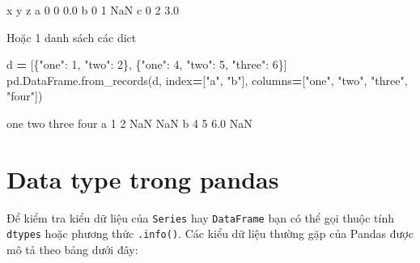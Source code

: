 \documentclass[
]{book}
\newenvironment{Shaded}{\begin{snugshade}}{\end{snugshade}}
\newcommand{\DecValTok}[1]{\textcolor[rgb]{0.00,0.00,0.81}{#1}}
\newcommand{\NormalTok}[1]{#1}
\newcommand{\OperatorTok}[1]{\textcolor[rgb]{0.81,0.36,0.00}{\textbf{#1}}}
\newcommand{\StringTok}[1]{\textcolor[rgb]{0.31,0.60,0.02}{#1}}
\begin{document}
\begin{Shaded}
\begin{Highlighting}[]
\NormalTok{   x  y    z}
\NormalTok{a  0  0  0.0}
\NormalTok{b  0  1  NaN}
\NormalTok{c  0  2  3.0}
\end{Highlighting}
\end{Shaded}

Hoặc 1 danh sách các dict

\begin{Shaded}
\begin{Highlighting}[]
\NormalTok{d }\OperatorTok{=}\NormalTok{ [\{}\StringTok{"one"}\NormalTok{: }\DecValTok{1}\NormalTok{, }\StringTok{"two"}\NormalTok{: }\DecValTok{2}\NormalTok{\}, \{}\StringTok{"one"}\NormalTok{: }\DecValTok{4}\NormalTok{, }\StringTok{"two"}\NormalTok{: }\DecValTok{5}\NormalTok{, }\StringTok{"three"}\NormalTok{: }\DecValTok{6}\NormalTok{\}]}
\NormalTok{pd.DataFrame.from\_records(d, index}\OperatorTok{=}\NormalTok{[}\StringTok{"a"}\NormalTok{, }\StringTok{"b"}\NormalTok{], columns}\OperatorTok{=}\NormalTok{[}\StringTok{"one"}\NormalTok{, }\StringTok{"two"}\NormalTok{, }\StringTok{"three"}\NormalTok{, }\StringTok{"four"}\NormalTok{])}
\end{Highlighting}
\end{Shaded}

\begin{Shaded}
\begin{Highlighting}[]
\NormalTok{   one  two  three  four}
\NormalTok{a    1    2    NaN   NaN}
\NormalTok{b    4    5    6.0   NaN}
\end{Highlighting}
\end{Shaded}

\section{Data type trong pandas}\label{data-type-trong-pandas}

Để kiểm tra kiểu dữ liệu của \texttt{Series} hay \texttt{DataFrame} bạn có thể gọi thuộc tính \texttt{dtypes} hoặc phương thức \texttt{.info()}.
Các kiểu dữ liệu thường gặp của Pandas được mô tả theo bảng dưới đây:
\end{document}
